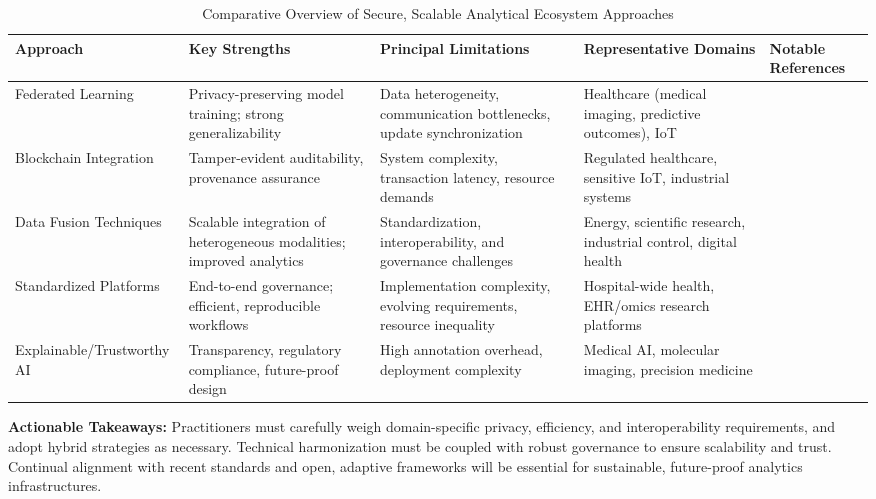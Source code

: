 \documentclass[sigconf]{acmart}
\begin{document}
\begin{table*}[htbp]
\centering
\caption{Comparative Overview of Secure, Scalable Analytical Ecosystem Approaches}
\label{tab:ecosystem_comparison}
\begin{adjustbox}{max width=\textwidth}
\begin{tabular}{@{}lllll@{}}
\toprule
\textbf{Approach} & \textbf{Key Strengths} & \textbf{Principal Limitations} & \textbf{Representative Domains} & \textbf{Notable References} \\
\midrule
Federated Learning    & Privacy-preserving model training; strong generalizability & Data heterogeneity, communication bottlenecks, update synchronization & Healthcare (medical imaging, predictive outcomes), IoT & \cite{ref31,ref51,ref36,ref84} \\
Blockchain Integration & Tamper-evident auditability, provenance assurance & System complexity, transaction latency, resource demands & Regulated healthcare, sensitive IoT, industrial systems & \cite{ref13,ref14,ref16,ref30,ref32,ref44,ref46,ref51} \\
Data Fusion Techniques & Scalable integration of heterogeneous modalities; improved analytics & Standardization, interoperability, and governance challenges & Energy, scientific research, industrial control, digital health & \cite{ref71,ref72,ref76,ref77,ref79,ref80,ref33,ref35,ref54} \\
Standardized Platforms & End-to-end governance; efficient, reproducible workflows & Implementation complexity, evolving requirements, resource inequality & Hospital-wide health, EHR/omics research platforms & \cite{ref36,ref84,ref4,ref44,ref45,ref104,ref61,ref62,ref40} \\
Explainable/Trustworthy AI & Transparency, regulatory compliance, future-proof design & High annotation overhead, deployment complexity & Medical AI, molecular imaging, precision medicine & \cite{ref70,ref65,ref107,ref54} \\
\bottomrule
\end{tabular}
\end{adjustbox}
\end{table*}

\textbf{Actionable Takeaways:} Practitioners must carefully weigh domain-specific privacy, efficiency, and interoperability requirements, and adopt hybrid strategies as necessary. Technical harmonization must be coupled with robust governance to ensure scalability and trust. Continual alignment with recent standards and open, adaptive frameworks will be essential for sustainable, future-proof analytics infrastructures.
\end{document}
